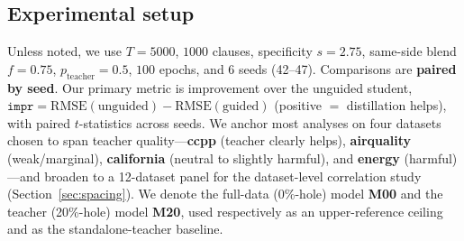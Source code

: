 \subsection{Experimental setup}
\label{sec:setup}

Unless noted, we use $T=5000$, $1000$ clauses, specificity $s=2.75$, same-side blend
$f=0.75$, $p_{\text{teacher}}=0.5$, $100$ epochs, and $6$ seeds (42--47). Comparisons are
\textbf{paired by seed}. Our primary metric is improvement over the unguided student,
$\texttt{impr} = \mathrm{RMSE}(\text{unguided}) - \mathrm{RMSE}(\text{guided})$ (positive
$=$ distillation helps), with paired $t$-statistics across seeds. We anchor most analyses
on four datasets chosen to span teacher quality---\textbf{ccpp} (teacher clearly helps),
\textbf{airquality} (weak/marginal), \textbf{california} (neutral to slightly harmful),
and \textbf{energy} (harmful)---and broaden to a 12-dataset panel for the dataset-level
correlation study (Section~\ref{sec:spacing}). We denote the full-data (0\%-hole) model
\textbf{M00} and the teacher (20\%-hole) model \textbf{M20}, used respectively as an
upper-reference ceiling and as the standalone-teacher baseline.
